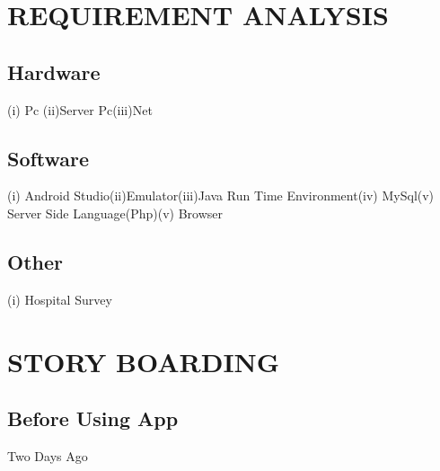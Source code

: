 \documentclass[12pt]{article}
\begin{document}
\newpage


\section{REQUIREMENT ANALYSIS}
\subsection {Hardware}\newline(i) Pc \newline(ii)Server Pc\newline (iii)Net 

\subsection {Software}\newline(i) Android Studio\newline (ii)Emulator\newline (iii)Java Run Time Environment\newline (iv) MySql\newline (v) Server Side Language(Php)\newline (v) Browser

\subsection {Other}\linebreak(i) Hospital Survey
\pagebreak


\section{STORY BOARDING}
\subsection{Before Using App}
Two Days Ago
\end{document}
